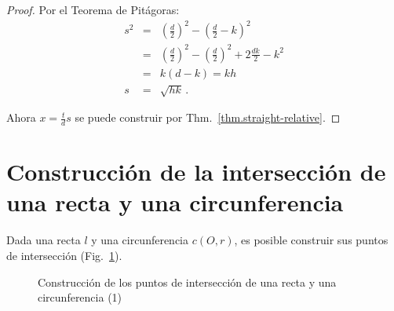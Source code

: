 \begin{proof}
Por el Teorema de Pitágoras:
\begin{eqnarray*}
s^2&=& \left(\frac{d}{2}\right)^2 - \left(\frac{d}{2}-k\right)^2\\
&=& \left(\frac{d}{2}\right)^2 - \left(\frac{d}{2}\right)^2 + 2\frac{dk}{2} - k^2\\
&=& k(d-k) = kh\\
s&=&\sqrt{hk}\,.
\end{eqnarray*}

Ahora $x=\displaystyle\frac{t}{d}s$ se puede construir por Thm.~\ref{thm.straight-relative}.
\end{proof}

\section{Construcción de la intersección de una recta y una circunferencia}\label{s.line-circle-straight}

\begin{theorem}
Dada una recta $l$ y una circunferencia $c(O,r)$, es posible construir sus puntos de intersección (Fig.~\ref{f.se-line-circle1}).
\end{theorem}
\begin{figure}[t]
\begin{center}
\end{center}
\caption{Construcción de los puntos de intersección de una recta y una circunferencia (1)}\label{f.se-line-circle1}
\end{figure}

